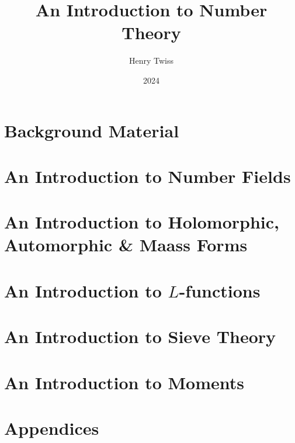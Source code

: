 \documentclass[12pt,oneside]{book}
\title{An Introduction to Number Theory}
\author{Henry Twiss}
\date{2024}
\begin{document}
\maketitle
\pagestyle{empty}
\tableofcontents
\setcounter{page}{0}
\pagestyle{fancy}

\part{Background Material}
  

\part{An Introduction to Number Fields}
  

\part{An Introduction to Holomorphic, Automorphic \& Maass Forms}
  
  
  
  

\part{An Introduction to \texorpdfstring{$L$}{L}-functions}
  
  
  

\part{An Introduction to Sieve Theory}
  
  

\part{An Introduction to Moments}
  
  

\part{Appendices}
  

\printindex


\end{document}
